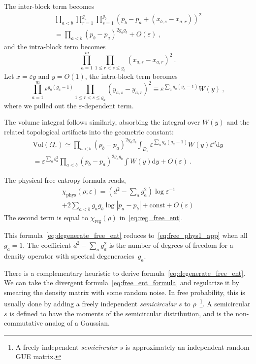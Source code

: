 \documentclass[aps,pre,twocolumn,superscriptaddress,amsmath,amssymb,reprint]{revtex4-2}
\newcommand{\dd}{\mathrm{d}}
\def\eps{\varepsilon}
\begin{document}
The inter-block term becomes
\begin{multline}
    \prod_{a<b}\prod_{r=1}^{g_a}\prod_{s=1}^{g_b}(p_b-p_a +(x_{b,s}-x_{a,r}))^2
     \\=\prod_{a<b}(p_b-p_a)^{2g_ag_b} + O(\eps)\ ,
\end{multline}
and the intra-block term becomes
\begin{equation}
     \prod_{a=1}^m\prod_{1\le r<s\le g_a}(x_{a,s}-x_{a,r})^2\ .
\end{equation}
Let $x=\eps y$ and $y=O(1)$, the intra-block term becomes
\begin{equation}
    \prod_{a=1}^m\eps^{g_a(g_a-1)}\prod_{1\le r<s\le g_a}(y_{a,s}-y_{a,r})^2\equiv \eps^{\sum_a g_a(g_a-1)}W(y)\ ,
\end{equation}
where we pulled out the $\eps$-dependent term.

The volume integral follows similarly, absorbing the integral over $W(y)$ and the related topological artifacts into the geometric constant:
\begin{multline}
   \mathrm{Vol}(\Omega_\eps) \simeq \prod_{a<b}(p_b-p_a)^{2g_ag_b} \int_{D_\eps} \eps^{\sum_ag_a(g_a-1)} W(y) \eps^d\dd y \\
   =\eps^{\sum_ag_a^2}\prod_{a<b}(p_b-p_a)^{2g_ag_b} \int W(y)\dd y + O(\eps)\ .
\end{multline}

The physical free entropy formula reads,
\begin{multline}\label{eq:degenerate_free_ent}
    \chi_\mathrm{phys}(\rho;\eps) = \left(d^2 - \sum_a g_a^2\right)\log \eps^{-1} \\+ 2\sum_{a<b}g_a g_b\log |p_a-p_b| + \mathrm{const} + O(\eps)
\end{multline}
The second term is equal to $\chi_\mathrm{reg}(\rho)$ in~\eqref{eq:reg_free_ent}.

This formula~\eqref{eq:degenerate_free_ent} reduces to~\eqref{eq:free_phys1_app} when all $g_a=1$. The coefficient $d^2 - \sum_a g_a^2$ is the number of degrees of freedom for a density operator with spectral degeneracies~$g_a$. 

There is a complementary heuristic to derive formula~\eqref{eq:degenerate_free_ent}. We can take the divergent formula~\eqref{eq:free_ent_formula} and regularize it by smearing the density matrix with some random noise. In free probability, this is usually done by adding a freely independent \emph{semicircular} $s$ to $\rho$~\footnote{A freely independent \emph{semicircular} $s$ is approximately an independent random GUE matrix.}. A semicircular $s$ is defined to have the moments of the semicircular distribution, and is the non-commutative analog of a Gaussian.
\end{document}
